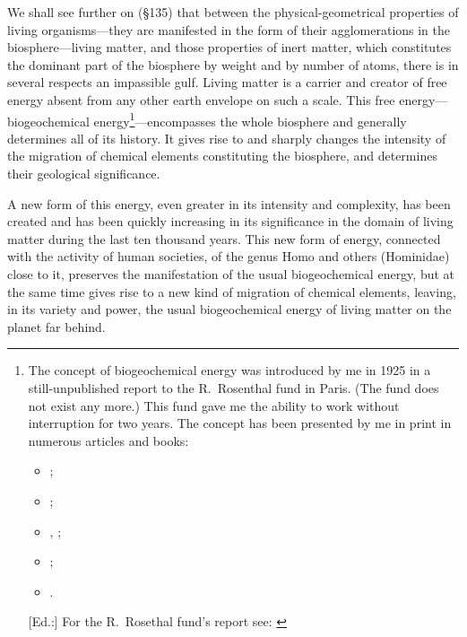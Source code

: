 We shall see further on (§135) that between the physical-geometrical
properties of living organisms---they are manifested in the form of their
agglomerations in the biosphere---living matter, and those properties of inert
matter, which constitutes the dominant part of the biosphere by weight and by
number of atoms, there is in several respects an impassible gulf.  Living
matter is a carrier and creator of free energy absent from any other earth
envelope on such a scale.  This free energy---biogeochemical
energy\footnote{
	The concept of biogeochemical energy was introduced by me in 1925 in a
	still-unpublished report to the R.~Rosenthal fund in Paris. (The fund
	does not exist any more.)  This fund gave me the ability to work
	without interruption for two years.  The concept has been presented by
	me in print in numerous articles and books:
	\begin{itemize}
	  \item \foreignlanguage{russian}{\cite[30--48]{vernadsky1926biosfera}};
	  \item \foreignlanguage{french}{\cite{vernadsky1926etudes1,
		  vernadsky1927etudes2}};
	  \item \foreignlanguage{russian}{\cite{vernadsky1926razmnozhenii1},
		  \cite{vernadsky1926razmnozhenii2}};
	  \item \foreignlanguage{french}{\cite{vernadsky1926multiplication1,
		  vernadsky1926multiplication2}};
	  \item \foreignlanguage{russian}{\cite{vernadsky1927bakteriofag}}.
	\end{itemize}
	[Ed.:] For the R.~Rosethal fund's report
	\foreignlanguage{russian}{} see:
	\foreignlanguage{russian}{\cite[555--602]{vernadsky1994zhivoe}}
}---encompasses the whole biosphere and generally determines all of its
history.  It gives rise to and sharply changes the intensity of the migration
of chemical elements constituting the biosphere, and determines their
geological significance.

A new form of this energy, even greater in its intensity and complexity, has
been created and has been quickly increasing in its significance in the domain
of living matter during the last ten thousand years.  This new form of energy,
connected with the activity of human societies, of the genus Homo and others
(Hominidae) close to it, preserves the manifestation of the usual
biogeochemical energy, but at the same time gives rise to a new kind of
migration of chemical elements, leaving, in its variety and power, the usual
biogeochemical energy of living matter on the planet far behind.

